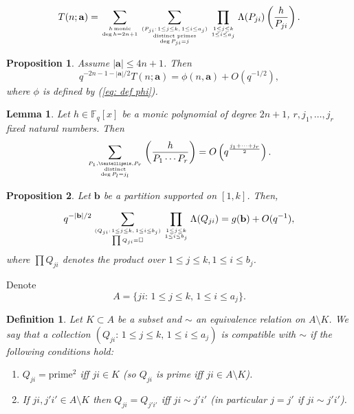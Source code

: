 \documentclass[10pt,a4paper]{amsart}
\newtheorem{prop}{Proposition}
\newtheorem{lem}{Lemma}
\newtheorem{definition}{Definition}
\newcommand{\F}{\mathbb{F}}
\begin{document}
\begin{equation}\label{eq: def T}
T(n;\mathbf a)=\sum_{h\,\mathrm{monic}\atop{\deg h=2n+1}}\sum_{(P_{ji}:\,1\le j\le k,\,1\le i\le a_j)\atop{\text {distinct primes}\atop{\deg P_{ji}=j}}}\prod_{1\le j\le k\atop{1\le i\le a_j}}\Lambda(P_{ji})\left(\frac h{P_{ji}}\right).
\end{equation}

\begin{prop}\label{prop_S_sum_estimate}
Assume $|\mathbf a|\le 4n+1$. Then
\begin{equation*}
    q^{-2n-1-|\mathbf a|/2}T(n;\mathbf a)=\phi(n,\mathbf a)+O\left(q^{-1/2}\right),
\end{equation*}
where $\phi$ is defined by (\ref{eq: def phi}).

\end{prop}

\begin{lem}\label{lem: weil gen} Let $h\in\F_q[x]$ be a monic polynomial of degree $2n+1$, $r,j_1,\ldots,j_r$ fixed natural numbers. Then
$$\sum_{P_1,\ldots,P_r\atop{\mathrm{distinct}\atop{\deg P_l=j_l}}}\left(\frac h{P_1\cdots P_r}\right)=O\left(q^{\frac{j_1+\cdots+j_r}2}\right).$$
\end{lem}

\begin{prop}\label{prop_sum_to_pair_up}
Let $\mathbf b$ be a partition supported on $[1,k]$. Then,

\begin{equation}\label{eq: contribution of squares} q^{-|\mathbf b|/2}\sum_{(Q_{ji}:\,1\le j\le k,\,1\le i\le b_j)\atop{\prod Q_{ji}=\square}}\prod_{1\le j\le k\atop{1\le i\le b_j}}\Lambda(Q_{ji})=g(\mathbf b)+O(q^{-1}),
\end{equation}
where $\prod Q_{ji}$ denotes the product over $1\le j\le k,1\le i\le b_j$.
\end{prop}

Denote \begin{equation}\label{eq: def A}A=\{ji:\,1\le j\le k,\,1\le i\le a_j\}.\end{equation}

\begin{definition}\label{def: compatible}Let $K\subset A$ be a subset and $\sim$ an equivalence relation on $A\setminus K$. We say that a collection $(Q_{ji}:\,1\le j\le k,\,1\le i\le a_j)$ is \emph{compatible with} $\sim$ if the following conditions hold:
\begin{enumerate}\item[(i)] $Q_{ji}=\text{prime}^2$ iff $ji\in K$ (so $Q_{ji}$ is prime iff $ji\in A\setminus K$).
\item[(ii)] If $ji,j'i'\in A\setminus K$ then $Q_{ji}=Q_{j'i'}$ iff $ji\sim j'i'$ (in particular $j=j'$ if $ji\sim j'i'$).
\end{enumerate}
\end{definition}
\end{document}
